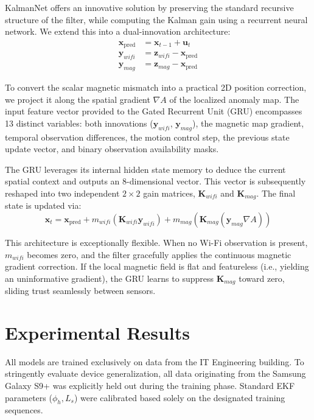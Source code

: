 \documentclass[conference]{IEEEtran}
\begin{document}
KalmanNet \cite{kalmannet} offers an innovative solution by preserving the standard recursive structure of the filter, while computing the Kalman gain using a recurrent neural network. We extend this into a dual-innovation architecture:
\begin{align}
\mathbf{x}_{\text{pred}} &= \mathbf{x}_{t-1} + \mathbf{u}_t \label{eq:kn_predict}\\
\mathbf{y}_{wifi} &= \mathbf{z}_{wifi} - \mathbf{x}_{\text{pred}} \label{eq:kn_innovate_w}\\
\mathbf{y}_{mag} &= \mathbf{z}_{mag} - \mathbf{x}_{\text{pred}} \label{eq:kn_innovate_m}
\end{align}

To convert the scalar magnetic mismatch into a practical 2D position correction, we project it along the spatial gradient $\nabla A$ of the localized anomaly map. The input feature vector provided to the Gated Recurrent Unit (GRU) encompasses 13 distinct variables: both innovations ($\mathbf{y}_{wifi}$, $\mathbf{y}_{mag}$), the magnetic map gradient, temporal observation differences, the motion control step, the previous state update vector, and binary observation availability masks.

The GRU leverages its internal hidden state memory to deduce the current spatial context and outputs an 8-dimensional vector. This vector is subsequently reshaped into two independent $2\!\times\!2$ gain matrices, $\mathbf{K}_{wifi}$ and $\mathbf{K}_{mag}$. The final state is updated via:
\begin{equation}
\mathbf{x}_t = \mathbf{x}_{\text{pred}} + m_{wifi} (\mathbf{K}_{wifi} \mathbf{y}_{wifi}) + m_{mag} (\mathbf{K}_{mag} (\mathbf{y}_{mag} \nabla A)) \label{eq:kn_correct}
\end{equation}

This architecture is exceptionally flexible. When no Wi-Fi observation is present, $m_{wifi}$ becomes zero, and the filter gracefully applies the continuous magnetic gradient correction. If the local magnetic field is flat and featureless (i.e., yielding an uninformative gradient), the GRU learns to suppress $\mathbf{K}_{mag}$ toward zero, sliding trust seamlessly between sensors.

\section{Experimental Results}\label{sec:results}

All models are trained exclusively on data from the IT Engineering building. To stringently evaluate device generalization, all data originating from the Samsung Galaxy S9+ was explicitly held out during the training phase. Standard EKF parameters ($\phi_h, L_s$) were calibrated based solely on the designated training sequences.
\end{document}
